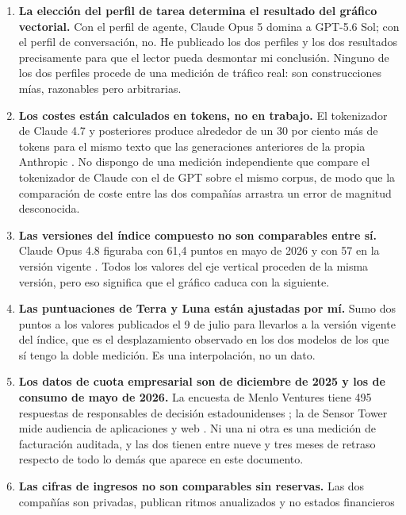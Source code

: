 \documentclass[11pt,letterpaper]{article}
\begin{document}
\begin{enumerate}
  \item \textbf{La elección del perfil de tarea determina el resultado del
    gráfico vectorial.} Con el perfil de agente, Claude Opus 5 domina a GPT-5.6
    Sol; con el perfil de conversación, no. He publicado los dos perfiles y los
    dos resultados precisamente para que el lector pueda desmontar mi
    conclusión. Ninguno de los dos perfiles procede de una medición de tráfico
    real: son construcciones mías, razonables pero arbitrarias.
  \item \textbf{Los costes están calculados en tokens, no en trabajo.} El
    tokenizador de Claude 4.7 y posteriores produce alrededor de un 30 por
    ciento más de tokens para el mismo texto que las generaciones anteriores de
    la propia Anthropic \parencite{anthropic2026precios}. No dispongo de una
    medición independiente que compare el tokenizador de Claude con el de GPT
    sobre el mismo corpus, de modo que la comparación de coste entre las dos
    compañías arrastra un error de magnitud desconocida.
  \item \textbf{Las versiones del índice compuesto no son comparables entre
    sí.} Claude Opus 4.8 figuraba con 61,4 puntos en mayo de 2026
    \parencite{aa2026opus48} y con 57 en la versión vigente
    \parencite{aa2026comparacion}. Todos los valores del eje vertical proceden de
    la misma versión, pero eso significa que el gráfico caduca con la siguiente.
  \item \textbf{Las puntuaciones de Terra y Luna están ajustadas por mí.} Sumo
    dos puntos a los valores publicados el 9 de julio \parencite{aa2026gpt56}
    para llevarlos a la versión vigente del índice, que es el desplazamiento
    observado en los dos modelos de los que sí tengo la doble medición. Es una
    interpolación, no un dato.
  \item \textbf{Los datos de cuota empresarial son de diciembre de 2025 y los de
    consumo de mayo de 2026.} La encuesta de Menlo Ventures tiene \num{495}
    respuestas de responsables de decisión estadounidenses \parencite{menlo2025};
    la de Sensor Tower mide audiencia de aplicaciones y web
    \parencite{sensortower2026}. Ni una ni otra es una medición de facturación
    auditada, y las dos tienen entre nueve y tres meses de retraso respecto de
    todo lo demás que aparece en este documento.
  \item \textbf{Las cifras de ingresos no son comparables sin reservas.} Las dos
    compañías son privadas, publican ritmos anualizados y no estados financieros

\end{enumerate}
\end{document}
